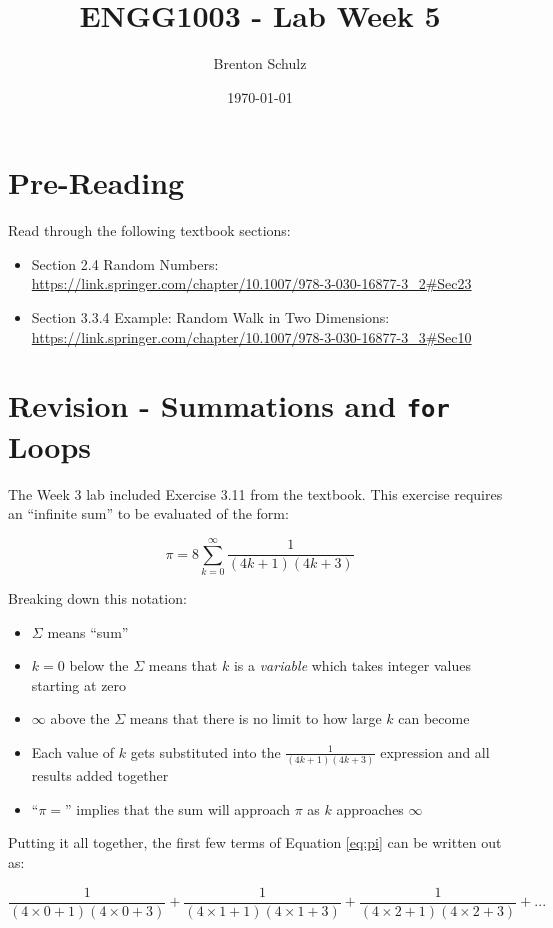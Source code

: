 \documentclass{lab}
\title{ENGG1003 - Lab Week 5}
\author{Brenton Schulz}
\date{\today}
\begin{document}
\maketitle

\section{Pre-Reading}
Read through the following textbook sections:

\begin{itemize}
\item Section 2.4 Random Numbers: \url{https://link.springer.com/chapter/10.1007/978-3-030-16877-3_2#Sec23}
\item Section 3.3.4 Example: Random Walk in Two Dimensions: \url{https://link.springer.com/chapter/10.1007/978-3-030-16877-3_3#Sec10}
\end{itemize}

\pagebreak

\section{Revision - Summations and \texttt{for} Loops}

The Week 3 lab included Exercise 3.11 from the textbook. This exercise requires an ``infinite sum'' to be evaluated of the form:

\begin{equation}\label{eq:pi}
\pi = 8 \sum_{k=0}^{\infty}\frac{1}{(4k+1)(4k+3)}
\end{equation}

Breaking down this notation:
\begin{itemize}
\item $\Sigma$ means ``sum''
\item $k=0$ below the $\Sigma$ means that $k$ is a \textit{variable} which takes integer values starting at zero
\item $\infty$ above the $\Sigma$ means that there is no limit to how large $k$ can become
\item Each value of $k$ gets substituted into the $\frac{1}{(4k+1)(4k+3)}$ expression and all results added together
\item ``$\pi=$'' implies that the sum will approach $\pi$ as $k$ approaches $\infty$
\end{itemize}

Putting it all together, the first few terms of Equation \ref{eq:pi} can be written out as:

\begin{equation}
\frac{1}{(4\times 0 + 1)(4 \times 0 + 3)} + \frac{1}{(4\times 1 + 1)(4 \times 1 + 3)} + \frac{1}{(4\times 2 + 1)(4 \times 2 + 3)} + ...
\end{equation}
\end{document}
